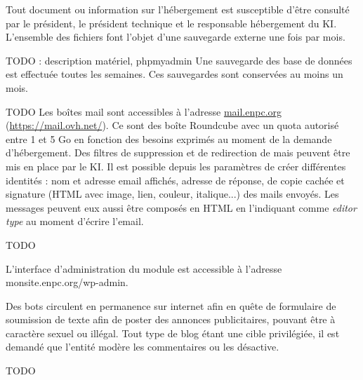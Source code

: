 \documentclass{ki019}
\begin{document}
Tout document ou information sur l'hébergement est susceptible d'être consulté par le président, le président technique et le responsable hébergement du KI.
L'ensemble des fichiers font l'objet d'une sauvegarde externe une fois par mois.


TODO : description matériel, phpmyadmin
Une sauvegarde des base de données est effectuée toutes les semaines. Ces sauvegardes sont conservées au moins un mois.


TODO
Les boîtes mail sont accessibles à l'adresse \url{mail.enpc.org} (\url{https://mail.ovh.net/}).
Ce sont des boîte Roundcube avec un quota autorisé entre 1 et 5 Go en fonction des besoins exprimés au moment de la demande d'hébergement.
Des filtres de suppression et de redirection de mais peuvent être mis en place par le KI.
Il est possible depuis les paramètres de créer différentes identités : nom et adresse email affichés, adresse de réponse, de copie cachée et signature (HTML avec image, lien, couleur, italique...) des mails envoyés.
Les messages peuvent eux aussi être composés en HTML en l'indiquant comme \textit{editor type} au moment d'écrire l'email.


TODO

L'interface d'administration du module est accessible à l'adresse monsite.enpc.org/wp-admin.

Des bots circulent en permanence sur internet afin en quête de formulaire de soumission de texte afin de poster des annonces publicitaires, pouvant être à caractère sexuel ou illégal. Tout type de blog étant une cible privilégiée, il est demandé que l'entité modère les commentaires ou les désactive.


TODO


\end{document}

